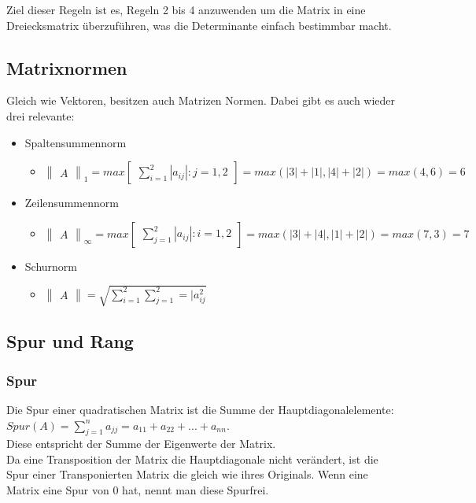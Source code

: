 \documentclass{article}
\begin{document}
	Ziel dieser Regeln ist es, Regeln 2 bis 4 anzuwenden um die Matrix in eine Dreiecksmatrix überzuführen, was die Determinante einfach bestimmbar macht.
	\subsection{Matrixnormen}
	Gleich wie Vektoren, besitzen auch Matrizen Normen. Dabei gibt es auch wieder drei relevante:
	\begin{itemize}
		\item{Spaltensummennorm}
		\begin{itemize}
			\item{$\begin{Vmatrix} A \end{Vmatrix}_1=max\begin{bmatrix}\sum_{i=1}^{2}|a_{ij}|:j=1,2\end{bmatrix}=max(|3|+|1|, |4|+|2|)=max(4,6)=6$}
		\end{itemize}
		\item{Zeilensummennorm}
		\begin{itemize}
			\item{$\begin{Vmatrix} A \end{Vmatrix}_{\infty}=max \begin{bmatrix} \sum_{j=1}^{2} |a_{ij}|:i=1,2 \end{bmatrix}=max(|3|+|4|, |1|+|2|)=max(7,3)=7	$}
		\end{itemize}
		\item{Schurnorm}
		\begin{itemize}
			\item{$\begin{Vmatrix} A \end{Vmatrix}=\sqrt{\sum_{i=1}^{2}\sum_{j=1}^{2}=|a_{ij}^2}$}
		\end{itemize}
	\end{itemize}
	\subsection{Spur und Rang}
	\subsubsection{Spur}
	Die Spur einer quadratischen Matrix ist die Summe der Hauptdiagonalelemente: $Spur(A)=\sum_{j=1}^{n}a_{jj}=a_{11}+a_{22}+...+a_{nn}$. \\
	Diese entspricht der Summe der Eigenwerte der Matrix. \\
	Da eine Transposition der Matrix die Hauptdiagonale nicht verändert, ist die Spur einer Transponierten Matrix die gleich wie ihres Originals. Wenn eine Matrix eine Spur von 0 hat, nennt man diese Spurfrei.
\end{document}
